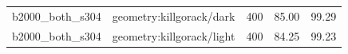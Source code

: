 \begin{longtable}{l>{\raggedright\arraybackslash}p{.42\linewidth}rrr}
b2000\_\allowbreak{}both\_\allowbreak{}s304 & %
geometry:killgorack/dark & %
400 & %
85.00 & %
99.29 \\ %

b2000\_\allowbreak{}both\_\allowbreak{}s304 & %
geometry:killgorack/light & %
400 & %
84.25 & %
99.23 \\ %


\end{longtable}
